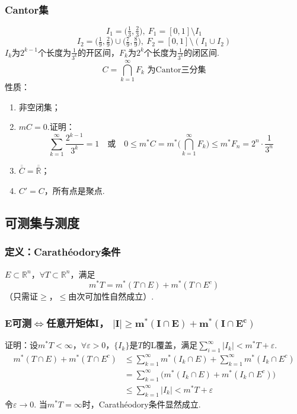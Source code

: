 \documentclass{article}
\begin{document}
	\subsubsection{Cantor集}
	\[
	I_1=\big(\tfrac13,\tfrac23\big),\ F_1=[0,1]\setminus I_1
	\]
	\[
	I_2=\big(\tfrac19,\tfrac29\big)\cup\big(\tfrac79,\tfrac89\big),\ F_2=[0,1]\setminus(I_1\cup I_2)
	\]
	$I_k$为$2^{k-1}$个长度为$\frac1{3^k}$的开区间，$F_k$为$2^k$个长度为$\frac1{3^k}$的闭区间.
	\[
	C=\bigcap_{k=1}^{\infty}F_k \text{ 为Cantor三分集}
	\]
	性质：
	\begin{enumerate}
		\item 非空闭集；
		\item $mC=0$.证明：
		\[
		\sum_{k=1}^{\infty}\frac{2^{k-1}}{3^k}=1\quad \text{或}\quad 0\le m^*C=m^*\Big(\bigcap_{k=1}^{\infty}F_k\Big)\le m^*F_n=2^n\cdot\frac1{3^n}
		\]
		\item $\overline{\overline{C}}=\overline{\overline{\mathbb{R}}}$；
		\item $C'=C$，所有点是聚点.
	\end{enumerate}
	
	\subsection{可测集与测度}
	\subsubsection{定义：Carathéodory条件}
	$E\subset\mathbb{R}^n$，$\forall T\subset\mathbb{R}^n$，满足
	\[
	m^*T = m^*(T\cap E)+m^*(T\cap E^c)
	\]
	（只需证$\ge$，$\le$由次可加性自然成立）.
	
	\subsubsection{E可测$\Leftrightarrow$任意开矩体I， $\bm{|I|\geq m^*(I\cap E)+m^*(I\cap E^c)}$}
	
	证明：设$m^*T<\infty$，$\forall \varepsilon>0$，$\{I_k\}$是$T$的L覆盖，满足$\displaystyle \sum_{i=1}^{\infty}|I_k|<m^*T+\varepsilon$.
	\[
	\begin{aligned}
		m^*(T\cap E)+m^*(T\cap E^c)
		&\le \sum_{k=1}^{\infty}m^*(I_k\cap E)+\sum_{k=1}^{\infty}m^*(I_k\cap E^c) \\
		&= \sum_{k=1}^{\infty}\Big(m^*(I_k\cap E)+m^*(I_k\cap E^c)\Big) \\
		&\le \sum_{k=1}^{\infty}|I_k| < m^*T+\varepsilon
	\end{aligned}
	\]
	令$\varepsilon\to0$.
	当$m^*T=\infty$时，Carathéodory条件显然成立.
	
\end{document}
